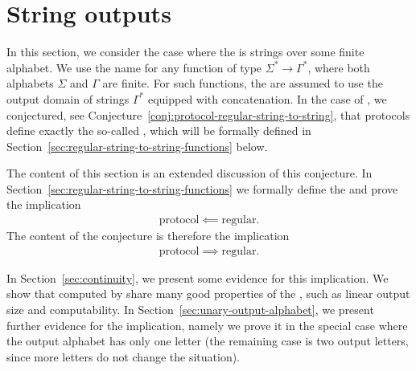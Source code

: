 \section{String outputs}
\label{sec:string-outputs}
\AP
In this section, we consider the case where the  is strings over
some finite alphabet. We use the name  for any
function of type $\Sigma^* \to \Gamma^*$, where both alphabets $\Sigma$ and
$\Gamma$ are finite. For such functions, the  are assumed to use the
output domain of strings $\Gamma^*$ equipped with concatenation. In the case of
, we conjectured, see
Conjecture~\ref{conj:protocol-regular-string-to-string},  that protocols define
exactly the so-called , which will be formally defined in
Section~\ref{sec:regular-string-to-string-functions} below.
 


The content of this section is an extended discussion of this conjecture.
In Section~\ref{sec:regular-string-to-string-functions} we  formally
define the  and  prove the implication 
\begin{align*}
\text{protocol} \impliedby \text{regular}.
\end{align*}
The content of the conjecture is therefore the implication 
\begin{align*}
\text{protocol} \implies \text{regular}.
\end{align*}

In Section~\ref{sec:continuity}, we present some evidence for this implication.
We show that  computed by  share
many good properties of the , such as linear output size
and computability. In Section~\ref{sec:unary-output-alphabet}, we present
further evidence for the implication, namely we  prove it in the special case
where the output alphabet has only one letter (the remaining case is two output
letters, since more letters do not change the situation). 




% 
% 
